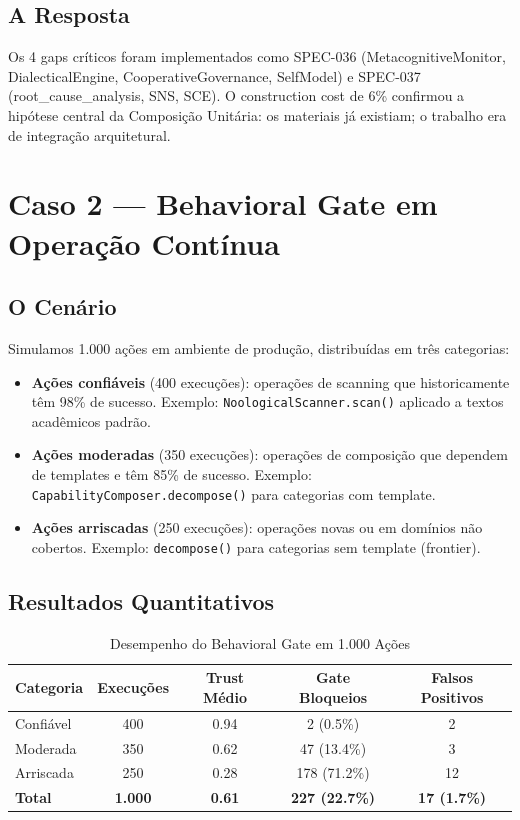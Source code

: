 \subsection{A Resposta}

Os 4 gaps críticos foram implementados como SPEC-036 (MetacognitiveMonitor, DialecticalEngine, CooperativeGovernance, SelfModel) e SPEC-037 (root\_cause\_analysis, SNS, SCE). O construction cost de 6\% confirmou a hipótese central da Composição Unitária: os materiais já existiam; o trabalho era de integração arquitetural.

\section{Caso 2 — Behavioral Gate em Operação Contínua}

\subsection{O Cenário}

Simulamos 1.000 ações em ambiente de produção, distribuídas em três categorias:

\begin{itemize}
    \item \textbf{Ações confiáveis} (400 execuções): operações de scanning que historicamente têm 98\% de sucesso. Exemplo: \texttt{NoologicalScanner.scan()} aplicado a textos acadêmicos padrão.
    \item \textbf{Ações moderadas} (350 execuções): operações de composição que dependem de templates e têm 85\% de sucesso. Exemplo: \texttt{CapabilityComposer.decompose()} para categorias com template.
    \item \textbf{Ações arriscadas} (250 execuções): operações novas ou em domínios não cobertos. Exemplo: \texttt{decompose()} para categorias sem template (frontier).
\end{itemize}

\subsection{Resultados Quantitativos}

\begin{table}[H]
\centering
\small
\caption{Desempenho do Behavioral Gate em 1.000 Ações}
\label{tab:gate_performance}
\begin{tabular}{lcccc}
\toprule
\textbf{Categoria} & \textbf{Execuções} & \textbf{Trust Médio} & \textbf{Gate Bloqueios} & \textbf{Falsos Positivos} \\
\midrule
Confiável & 400 & 0.94 & 2 (0.5\%) & 2 \\
Moderada & 350 & 0.62 & 47 (13.4\%) & 3 \\
Arriscada & 250 & 0.28 & 178 (71.2\%) & 12 \\
\midrule
\textbf{Total} & \textbf{1.000} & \textbf{0.61} & \textbf{227 (22.7\%)} & \textbf{17 (1.7\%)} \\
\bottomrule
\end{tabular}
\end{table}

